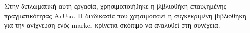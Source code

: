 Στην διπλωματική αυτή εργασία, χρησιμοποιήθηκε η βιβλιοθήκη επαυξημένης πραγματικότητας ArUco. Η διαδικασία που χρησιμοποιεί η συγκεκριμένη βιβλιοθήκη για την ανίχνευση ενός marker κρίνεται σκόπιμο να αναλυθεί στη συνέχεια.



